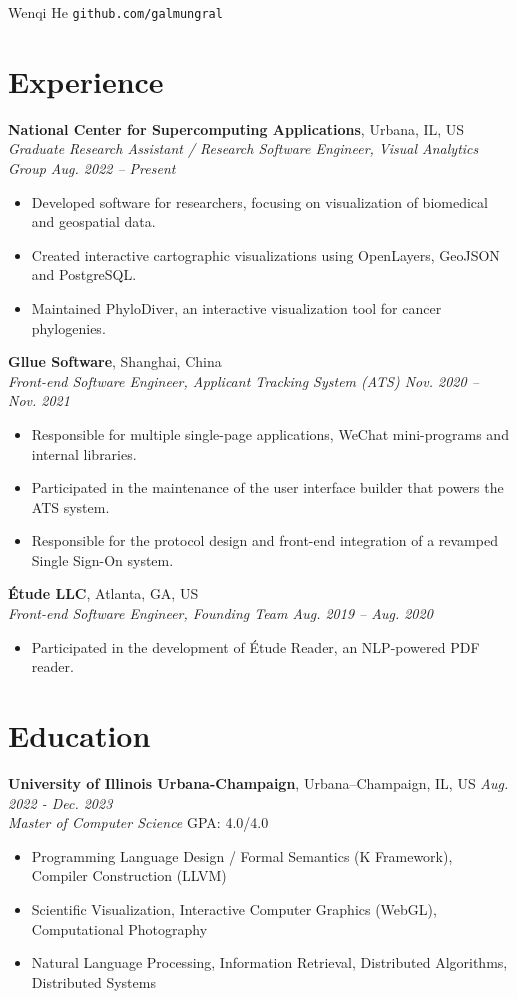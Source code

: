 \documentclass[12pt]{article}
\begin{document}
{\Huge Wenqi He} \quad \texttt{github.com/galmungral}

\section*{Experience}
\textbf{National Center for Supercomputing Applications}, Urbana, IL, US\\
\textit{\textit{Graduate Research Assistant / Research Software Engineer}, Visual Analytics Group \hfill Aug. 2022 -- Present}
\begin{itemize}
\item Developed software for researchers, focusing on visualization of biomedical and geospatial data.
\item Created interactive cartographic visualizations using OpenLayers, GeoJSON and PostgreSQL.
\item Maintained PhyloDiver, an interactive visualization tool for cancer phylogenies.
\end{itemize}
\vspace{0.5em}
\textbf{Gllue Software}, Shanghai, China\\
\textit{Front-end Software Engineer, Applicant Tracking System (ATS) \hfill Nov. 2020 -- Nov. 2021}
\begin{itemize}
\item Responsible for multiple single-page applications, WeChat mini-programs and internal libraries.
\item Participated in the maintenance of the user interface builder that powers the ATS system.
\item Responsible for the protocol design and front-end integration of a revamped Single Sign-On system.
\end{itemize}
\vspace{0.5em}
\textbf{Étude LLC}, Atlanta, GA, US\\
\textit{Front-end Software Engineer, Founding Team \hfill Aug. 2019 -- Aug. 2020}
\begin{itemize}
\item Participated in the development of Étude Reader, an NLP-powered PDF reader.
\end{itemize}

\section*{Education}
\textbf{University of Illinois Urbana-Champaign}, Urbana–Champaign, IL, US \hfill \textit{Aug. 2022 - Dec. 2023} \\
\textit{Master of Computer Science}  \hfill GPA: 4.0/4.0 
\begin{itemize}
\item Programming Language Design / Formal Semantics (K Framework), Compiler Construction (LLVM)
\item Scientific Visualization, Interactive Computer Graphics (WebGL), Computational Photography
\item Natural Language Processing, Information Retrieval, Distributed Algorithms, Distributed Systems
\end{itemize}
\end{document}

